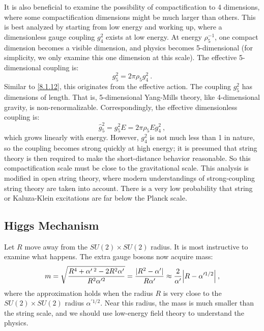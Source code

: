 It is also beneficial to examine the possibility of compactification to 4 dimensions, where some compactification dimensions might be much larger than others. This is best analyzed by starting from low energy and working up, where a dimensionless gauge coupling $g_{4}^{2}$ exists at low energy. 
At energy $\rho_{5}^{-1}$, one compact dimension becomes a visible dimension, and physics becomes 5-dimensional (for simplicity, we only examine this one dimension at this scale).
The effective 5-dimensional coupling is:
\begin{equation}
	g_{5}^{2}=2 \pi \rho_{5} g_{4}^{2} \:. \label{8.3.18}
\end{equation}
Similar to \eqref{8.1.12}, this originates from the effective action. The coupling $g_{5}^{2}$ has dimensions of length. That is, 5-dimensional Yang-Mills theory, like 4-dimensional gravity, is non-renormalizable. 
Correspondingly, the effective dimensionless coupling is:
\begin{equation}
	\hat{g}_{5}^{2}=g_{5}^{2} E=2 \pi \rho_{5} E g_{4}^{2} \:, \label{8.3.19}
\end{equation}
which grows linearly with energy. However, $g_{4}^{2}$ is not much less than 1 in nature, so the coupling becomes strong quickly at high energy; it is presumed that string theory is then required to make the short-distance behavior reasonable. 
So this compactification scale must be close to the gravitational scale. This analysis is modified in open string theory, where modern understandings of strong-coupling string theory are taken into account. 
There is a very low probability that string or Kaluza-Klein excitations are far below the Planck scale.

\subsection*{Higgs Mechanism}
Let $R$ move away from the $S U(2) \times S U(2)$ radius. It is most instructive to examine what happens. The extra gauge bosons now acquire mass:
\begin{equation}
	m=\sqrt{\frac{R^4+\alpha{'}\,^2-2R^2\alpha'}{R^2\alpha'^2}}=\frac{|R^{2}-\alpha^{\prime}|}{R \alpha^{\prime}} \approx \frac{2}{\alpha^{\prime}}\Bigl|R-\alpha^{\prime 1 / 2}\Bigr| \:, \label{8.3.20}
\end{equation}
where the approximation holds when the radius $R$ is very close to the $S U(2) \times S U(2)$ radius $\alpha^{\prime 1 / 2}$. Near this radius, the mass is much smaller than the string scale, and we should use low-energy field theory to understand the physics.

